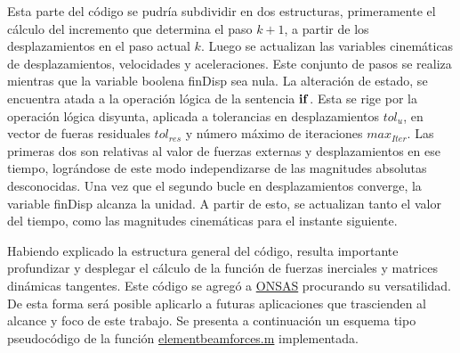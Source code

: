 Esta parte del código se pudría subdividir en dos estructuras, primeramente el cálculo del incremento que determina el paso $k+1$, a partir de los desplazamientos en el paso actual $k$. Luego se actualizan las variables cinemáticas de desplazamientos, velocidades y aceleraciones. Este conjunto de pasos se realiza mientras que la variable boolena finDisp sea nula. La alteración de estado, se encuentra atada a la operación lógica de la sentencia $\bf{if}$. Esta se rige por la operación lógica disyunta, aplicada a tolerancias en desplazamientos $tol_u$, en vector de fueras residuales $tol_{res}$ y número máximo de iteraciones $max_{Iter}$. Las primeras dos son relativas al valor de fuerzas externas y desplazamientos en ese tiempo, lográndose de este modo independizarse de las magnitudes absolutas desconocidas. Una vez que el segundo bucle en desplazamientos converge, la variable finDisp alcanza la unidad. A partir de esto, se actualizan tanto el valor del tiempo, como las magnitudes cinemáticas para el instante siguiente.

Habiendo explicado la estructura general del código, resulta importante profundizar y desplegar el cálculo de la función de fuerzas inerciales y matrices dinámicas tangentes. Este código se agregó a \href{https://github.com/ONSAS/ONSAS/}{ONSAS} procurando su versatilidad. De esta forma será posible aplicarlo a futuras aplicaciones que trascienden al alcance y foco de este trabajo. Se presenta a continuación un esquema tipo pseudocódigo de la función \href{https://github.com/ONSAS/ONSAS/blob/master/src/elementBeamForces.m}{elementbeamforces.m} implementada.

